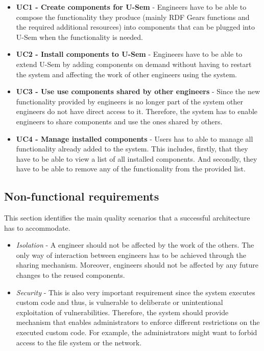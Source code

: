 \begin{itemize}

	\item \textbf{UC1 - Create components for U-Sem} - Engineers have to be able to compose the functionality they produce (mainly RDF Gears functions and the required additional resources) into components that can be plugged into U-Sem when the functionality is needed.
	
	\item \textbf{UC2 - Install components to U-Sem} - Engineers have to be able to extend U-Sem by adding components on demand without having to restart the system and affecting the work of other engineers using the system.
	
	\item \textbf{UC3 - Use use components shared by other engineers} - Since the new functionality provided by engineers is no longer part of the system other engineers do not have direct access to it. Therefore, the system has to enable engineers to share components and use the ones shared by others.
	
	\item \textbf{UC4 - Manage installed components} - Users has to able to manage all functionality already added to the system. This includes, firstly, that they have to be able to view a list of all installed components. And secondly, they have to be able to remove any of the functionality from the provided list.
			
\end{itemize}

\subsection{Non-functional requirements}

This section identifies the main quality scenarios that a successful architecture has to accommodate. 

\begin{itemize}
	
	\item \textit{Isolation} - A engineer should not be affected by the work of the others. The only way of interaction between engineers has to be achieved through the sharing mechanism. Moreover, engineers should not be affected by any future changes to the reused components.
		
	\item \textit{Security} - This is also very important requirement since the system executes custom code and thus, is vulnerable to deliberate or unintentional exploitation of vulnerabilities. Therefore, the system should provide mechanism that enables administrators to enforce different restrictions on the executed custom code. For example, the administrators might want to forbid access to the file system or the network.
	
\end{itemize}

